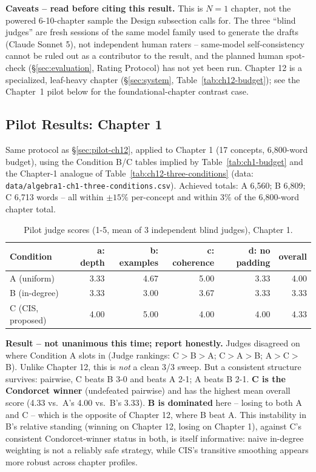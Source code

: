 \textbf{Caveats -- read before citing this result.} This is $N=1$ chapter,
not the powered 6-10-chapter sample the Design subsection calls for. The
three ``blind judges'' are fresh sessions of the same model family used to
generate the drafts (Claude Sonnet 5), not independent human raters --
same-model self-consistency cannot be ruled out as a contributor to the
result, and the planned human spot-check (\S\ref{sec:evaluation}, Rating
Protocol) has not yet been run. Chapter 12 is a specialized, leaf-heavy
chapter (\S\ref{sec:system}, Table~\ref{tab:ch12-budget}); see the
Chapter~1 pilot below for the foundational-chapter contrast case.

\subsection{Pilot Results: Chapter 1}
\label{sec:pilot-ch1}


Same protocol as \S\ref{sec:pilot-ch12}, applied to Chapter 1 (17 concepts,
6{,}800-word budget), using the Condition B/C tables implied by
Table~\ref{tab:ch1-budget} and the Chapter-1 analogue of
Table~\ref{tab:ch12-three-conditions} (data:
\texttt{data/algebra1-ch1-three-conditions.csv}). Achieved totals: A 6{,}560;
B 6{,}809; C 6{,}713 words -- all within $\pm 15\%$ per-concept and within
3\% of the 6{,}800-word chapter total.

\begin{table}[htbp]
\centering
\caption{Pilot judge scores (1-5, mean of 3 independent blind judges), Chapter 1.}
\label{tab:pilot-ch1-scores}
\begin{tabular}{lrrrrr}
\toprule
Condition & a: depth & b: examples & c: coherence & d: no padding & overall \\
\midrule
A (uniform)         & 3.33 & 4.67 & 5.00 & 3.33 & 4.00 \\
B (in-degree)        & 3.33 & 3.00 & 3.67 & 3.33 & 3.33 \\
C (CIS, proposed)    & 4.00 & 5.00 & 4.00 & 4.00 & 4.33 \\
\bottomrule
\end{tabular}
\end{table}

\textbf{Result -- not unanimous this time; report honestly.} Judges disagreed
on where Condition A slots in (Judge rankings: C$>$B$>$A; C$>$A$>$B;
A$>$C$>$B). Unlike Chapter 12, this is \emph{not} a clean 3/3 sweep. But a
consistent structure survives: pairwise, C beats B 3-0 and beats A 2-1; A
beats B 2-1. \textbf{C is the Condorcet winner} (undefeated pairwise) and has
the highest mean overall score (4.33 vs.\ A's 4.00 vs.\ B's 3.33).
\textbf{B is dominated} here -- losing to both A and C -- which is the
opposite of Chapter 12, where B beat A. This instability in B's relative
standing (winning on Chapter 12, losing on Chapter 1), against C's
consistent Condorcet-winner status in both, is itself informative: naive
in-degree weighting is not a reliably safe strategy, while CIS's transitive
smoothing appears more robust across chapter profiles.

